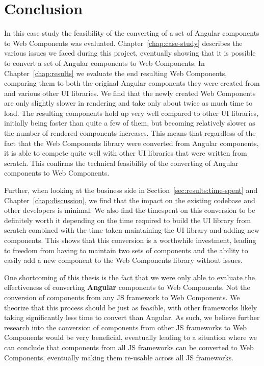 \chapter{Conclusion}

In this case study the feasibility of the converting of a set of Angular components to Web Components was evaluated. Chapter~\ref{chap:case-study} describes the various issues we faced during this project, eventually showing that it is possible to convert a set of Angular components to Web Components. In Chapter~\ref{chap:results} we evaluate the end resulting Web Components, comparing them to both the original Angular components they were created from and various other UI libraries. We find that the newly created Web Components are only slightly slower in rendering and take only about twice as much time to load. The resulting components hold up very well compared to other UI libraries, initially being faster than quite a few of them, but becoming relatively slower as the number of rendered components increases. This means that regardless of the fact that the Web Components library were converted from Angular components, it is able to compete quite well with other UI libraries that were written from scratch. This confirms the technical feasibility of the converting of Angular components to Web Components.

Further, when looking at the business side in Section~\ref{sec:results:time-spent} and Chapter~\ref{chap:discussion}, we find that the impact on the existing codebase and other developers is minimal. We also find the timespent on this conversion to be definitely worth it depending on the time required to build the UI library from scratch combined with the time taken maintaining the UI library and adding new components. This shows that this conversion is a worthwhile investment, leading to freedom from having to maintain two sets of components and the ability to easily add a new component to the Web Components library without issues.

One shortcoming of this thesis is the fact that we were only able to evaluate the effectiveness of converting \textbf{Angular} components to Web Components. Not the conversion of components from any JS framework to Web Components. We theorize that this process should be just as feasible, with other frameworks likely taking significantly less time to convert than Angular. As such, we believe further research into the conversion of components from other JS frameworks to Web Components would be very beneficial, eventually leading to a situation where we can conclude that components from all JS frameworks can be converted to Web Components, eventually making them re-usable across all JS frameworks.